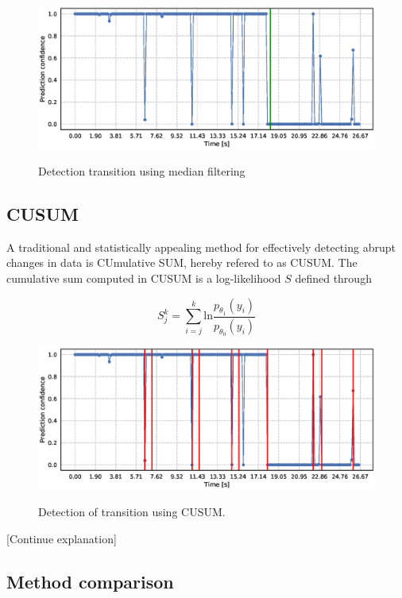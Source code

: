 \begin{figure}
	\includegraphics[scale=0.5]{figs_temp/detect_median}
	\label{fig:detect_median}
	\caption{Detection transition using median filtering}
\end{figure}

\subsection{CUSUM}

A traditional and statistically appealing method for effectively detecting abrupt changes in data is CUmulative SUM, hereby refered to as CUSUM. The cumulative sum computed in CUSUM is a log-likelihood $S$ defined through

\begin{equation}
	S_j^k = \sum_{i=j}^k \text{ln}\frac{p_{\theta_1}(y_i)}{p_{\theta_0}(y_i)}
\end{equation}

\begin{figure}
	\includegraphics[scale=0.5]{figs_temp/detect_cusum}
	\label{fig:detect_cusum}
	\caption{Detection of transition using CUSUM.}
\end{figure}

[Continue explanation]






\subsection{Method comparison}

